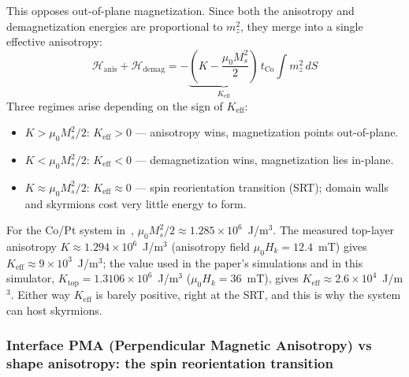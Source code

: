 \documentclass[11pt,a4paper]{article}
\newcommand{\tCo}{t_{\text{Co}}}
\newcommand{\Keff}{K_{\text{eff}}}
\newcommand{\Ms}{M_s}
\begin{document}
This opposes out-of-plane magnetization.  Since both the anisotropy
and demagnetization energies are proportional to $m_z^2$, they merge
into a single effective anisotropy:
%
\begin{equation}
\mathcal{H}_{\text{anis}} + \mathcal{H}_{\text{demag}} =
    -\underbrace{\left(K - \frac{\mu_0 \Ms^2}{2}\right)}_{\Keff}
    \, \tCo \int m_z^2 \, dS
\end{equation}
%
Three regimes arise depending on the sign of $\Keff$:
%
\begin{itemize}[nosep]
\item $K > \mu_0 \Ms^2/2$: $\Keff > 0$
    --- anisotropy wins, magnetization points out-of-plane.
\item $K < \mu_0 \Ms^2/2$: $\Keff < 0$
    --- demagnetization wins, magnetization lies in-plane.
\item $K \approx \mu_0 \Ms^2/2$: $\Keff \approx 0$
    --- spin reorientation transition (SRT); domain walls and
    skyrmions cost very little energy to form.
\end{itemize}
%
For the Co/Pt system in~\cite{pham2024},
$\mu_0 \Ms^2/2 \approx 1.285 \times 10^6$~J/m$^3$.  The measured
top-layer anisotropy $K \approx 1.294 \times 10^6$~J/m$^3$
(anisotropy field $\mu_0 H_k = 12.4$~mT) gives
$\Keff \approx 9 \times 10^3$~J/m$^3$; the value used in the
paper's simulations and in this simulator,
$K_{\text{top}} = 1.3106 \times 10^6$~J/m$^3$
($\mu_0 H_k = 36$~mT), gives
$\Keff \approx 2.6 \times 10^4$~J/m$^3$.  Either way $\Keff$ is
barely positive, right at the SRT, and this is why the system can
host skyrmions.

\subsubsection*{Interface PMA (Perpendicular Magnetic
Anisotropy) vs shape anisotropy: the spin reorientation
transition}
\end{document}
